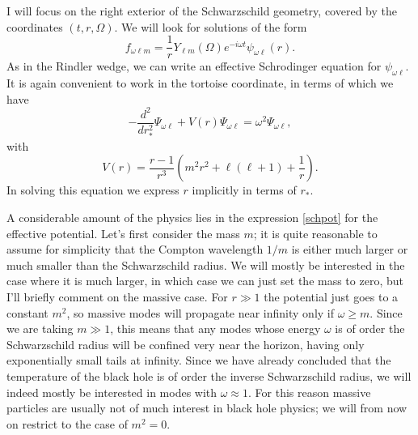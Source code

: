 \documentclass[12pt]{article}
\newcommand{\be}{\begin{equation}}
\newcommand{\ee}{\end{equation}}
\begin{document}
I will focus on the right exterior of the Schwarzschild geometry, covered by the coordinates $(t,r,\Omega)$.  We will look for 
solutions of the form
\be\label{schmode}
f_{\omega \ell m}=\frac{1}{r}Y_{\ell m}(\Omega) e^{-i \omega t}\psi_{\omega\ell}(r).
\ee
As in the Rindler wedge, we can write an effective Schrodinger equation for $\psi_{\omega\ell}$.  It is again convenient to work in the tortoise coordinate, in terms of which we have
\be\label{modeeq}
-\frac{d^2}{dr_*^2}\Psi_{\omega\ell}+V(r)\Psi_{\omega\ell}=\omega^2\Psi_{\omega\ell},
\ee
with
\be\label{schpot}
V(r)=\frac{r-1}{r^3}\left(m^2r^2+\ell(\ell+1)+\frac{1}{r}\right).
\ee
In solving this equation we express $r$ implicitly in terms of $r_*$.

A considerable amount of the physics lies in the expression \eqref{schpot} for the effective potential.  Let's first consider the mass $m$; it is quite reasonable to assume for simplicity that the Compton wavelength $1/m$ is either much larger or much smaller than the Schwarzschild radius.  We will mostly be interested in the case where it is much larger, in which case we can just set the mass to zero, but I'll briefly comment on the massive case.  For $r\gg 1$ the potential just goes to a constant $m^2$, so massive modes will propagate near infinity only if $\omega \geq m$.  Since we are taking $m\gg 1$, this means that any modes whose energy $\omega$ is of order the Schwarzschild radius will be confined very near the horizon, having only exponentially small tails at infinity.  Since we have already concluded that the temperature of the black hole is of order the inverse Schwarzschild radius, we will indeed mostly be interested in modes with $\omega\approx 1$.  For this reason massive particles are usually not of much interest in black hole physics; we will from now on restrict to the case of $m^2=0$.  
\end{document}
